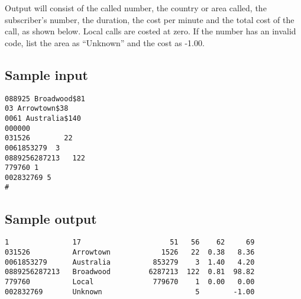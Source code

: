Output will consist of the called number, the country or area called, the
subscriber's number, the duration, the cost per minute and the total cost
of the call, as shown below.  Local calls are costed at zero.  If the number
has an invalid code, list the area as ``Unknown'' and the cost as -1.00.

\subsection*{Sample input}

\begin{verbatim}
088925 Broadwood$81
03 Arrowtown$38
0061 Australia$140
000000
031526        22
0061853279  3
0889256287213   122
779760 1
002832769 5
#
\end{verbatim}

\subsection*{Sample output}

\begin{verbatim}
1               17                     51   56    62     69
031526          Arrowtown            1526   22  0.38   8.36
0061853279      Australia          853279    3  1.40   4.20
0889256287213   Broadwood         6287213  122  0.81  98.82
779760          Local              779670    1  0.00   0.00
002832769       Unknown                      5        -1.00
\end{verbatim}

